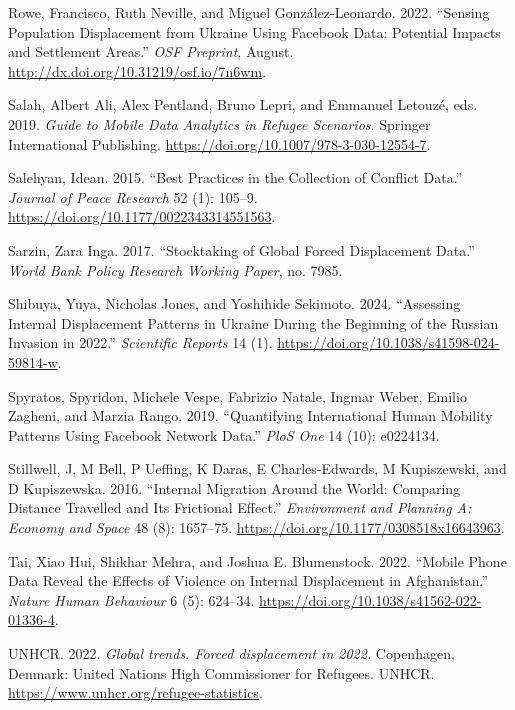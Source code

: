 \documentclass[
  sn-nature,
  11pt,
]{sn-jnl}
\newlength{\cslhangindent}
\newenvironment{CSLReferences}[2] %
 {\begin{list}{}{%
  \setlength{\itemindent}{0pt}
  \setlength{\leftmargin}{0pt}
  \setlength{\parsep}{0pt}
  \ifodd #1
   \setlength{\leftmargin}{\cslhangindent}
   \setlength{\itemindent}{-1\cslhangindent}
  \fi
  \setlength{\itemsep}{#2\baselineskip}}}
 {\end{list}}
\begin{document}
\begin{CSLReferences}{1}{0}
Rowe, Francisco, Ruth Neville, and Miguel González-Leonardo. 2022.
{``Sensing Population Displacement from Ukraine Using Facebook Data:
Potential Impacts and Settlement Areas.''} \emph{OSF Preprint}, August.
\url{http://dx.doi.org/10.31219/osf.io/7n6wm}.

Salah, Albert Ali, Alex Pentland, Bruno Lepri, and Emmanuel Letouzé,
eds. 2019. \emph{Guide to Mobile Data Analytics in Refugee Scenarios}.
Springer International Publishing.
\url{https://doi.org/10.1007/978-3-030-12554-7}.

Salehyan, Idean. 2015. {``Best Practices in the Collection of Conflict
Data.''} \emph{Journal of Peace Research} 52 (1): 105--9.
\url{https://doi.org/10.1177/0022343314551563}.

Sarzin, Zara Inga. 2017. {``Stocktaking of Global Forced Displacement
Data.''} \emph{World Bank Policy Research Working Paper}, no. 7985.

Shibuya, Yuya, Nicholas Jones, and Yoshihide Sekimoto. 2024.
{``Assessing Internal Displacement Patterns in Ukraine During the
Beginning of the Russian Invasion in 2022.''} \emph{Scientific Reports}
14 (1). \url{https://doi.org/10.1038/s41598-024-59814-w}.

Spyratos, Spyridon, Michele Vespe, Fabrizio Natale, Ingmar Weber, Emilio
Zagheni, and Marzia Rango. 2019. {``Quantifying International Human
Mobility Patterns Using Facebook Network Data.''} \emph{PloS One} 14
(10): e0224134.

Stillwell, J, M Bell, P Ueffing, K Daras, E Charles-Edwards, M
Kupiszewski, and D Kupiszewska. 2016. {``Internal Migration Around the
World: Comparing Distance Travelled and Its Frictional Effect.''}
\emph{Environment and Planning A: Economy and Space} 48 (8): 1657--75.
\url{https://doi.org/10.1177/0308518x16643963}.

Tai, Xiao Hui, Shikhar Mehra, and Joshua E. Blumenstock. 2022. {``Mobile
Phone Data Reveal the Effects of Violence on Internal Displacement in
Afghanistan.''} \emph{Nature Human Behaviour} 6 (5): 624--34.
\url{https://doi.org/10.1038/s41562-022-01336-4}.

UNHCR. 2022. \emph{Global trends. Forced displacement in 2022.}
Copenhagen, Denmark: {United Nations High Commissioner for Refugees.
UNHCR}. \url{https://www.unhcr.org/refugee-statistics}.


\end{CSLReferences}
\end{document}
